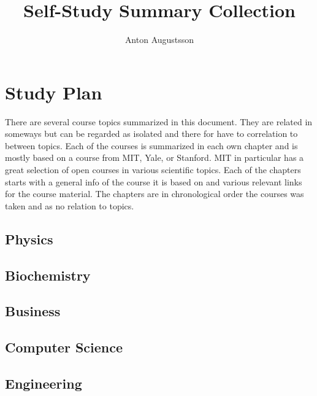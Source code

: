 \documentclass{book}
\title{Self-Study Summary Collection}
\author{Anton Augustsson}
\begin{document}
\maketitle
\newpage
\tableofcontents
\newpage



\chapter{Study Plan}
There are several course topics summarized in this document.
They are related in someways but can be regarded as isolated and there for have to correlation to between topics.
Each of the courses is summarized in each own chapter and is mostly based on a course from MIT, Yale, or Stanford.
MIT in particular has a great selection of open courses in various scientific topics. Each of the chapters starts
with a general info of the course it is based on and various relevant links for the course material.
The chapters are in chronological order the courses was taken and as no relation to topics.
\newpage

\section{Physics}
\resizebox{0.9\textwidth}{!}{} \newpage

\section{Biochemistry}
\resizebox{0.9\textwidth}{!}{} \newpage

\section{Business}
\resizebox{0.9\textwidth}{!}{} \newpage

\section{Computer Science}
\resizebox{0.9\textwidth}{!}{} \newpage

\section{Engineering}
\resizebox{0.9\textwidth}{!}{} \newpage
  
\end{document}
